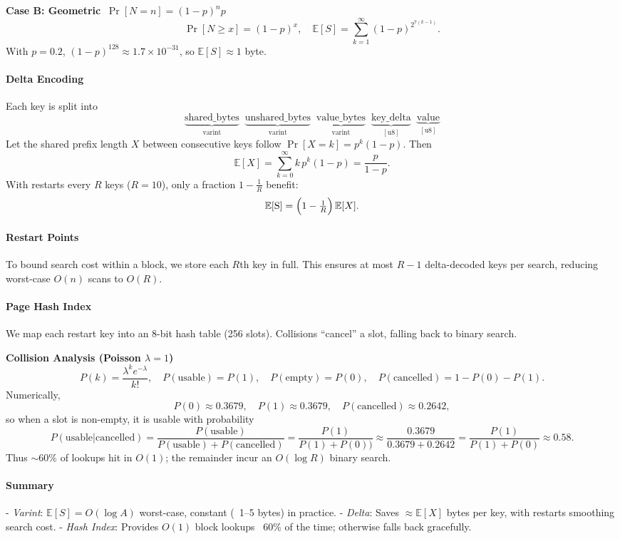 \documentclass[10pt]{article}
\begin{document}
\textbf{Case B: Geometric \(\, \Pr[N=n]=(1-p)^n p\)}
\[
\Pr[N\ge x] = (1-p)^x,\quad
\mathbb{E}[S] = \sum_{k=1}^\infty (1-p)^{2^{7(k-1)}}.
\]
With \(p=0.2\), \((1-p)^{128}\approx1.7\times10^{-31}\), so \(\mathbb{E}[S]\approx1\) byte.

\paragraph{Delta Encoding}
Each key is split into
\[
\underbrace{\text{shared\_bytes}}_{\text{varint}}
\;\;
\underbrace{\text{unshared\_bytes}}_{\text{varint}}
\;\;
\underbrace{\text{value\_bytes}}_{\text{varint}}
\;\;
\underbrace{\text{key\_delta}}_{[\text{u8}]}
\;\;
\underbrace{\text{value}}_{[\text{u8}]}
\]
Let the shared prefix length \(X\) between consecutive keys follow
\(\Pr[X=k]=p^k(1-p)\).  Then
\[
\mathbb{E}[X] = \sum_{k=0}^\infty k\,p^k(1-p) = \frac{p}{1-p}.
\]
With restarts every \(R\) keys (\(R=10\)), only a fraction \(1-\tfrac1R\) benefit:
\[
\mathbb{E}[\text{S}] = \Bigl(1 - \tfrac1R\Bigr)\,\mathbb{E}[X].
\]

\paragraph{Restart Points}
To bound search cost within a block, we store each \(R\)th key in full.  This ensures
at most \(R-1\) delta-decoded keys per search, reducing worst-case \(O(n)\) scans to \(O(R)\).

\paragraph{Page Hash Index}
We map each restart key into an 8-bit hash table (256 slots).  Collisions “cancel” a slot, falling back to binary search.

\textbf{Collision Analysis (Poisson \(\lambda=1\))}
\[
P(k) = \frac{\lambda^k e^{-\lambda}}{k!},\quad
P(\text{usable}) = P(1),\quad
P(\text{empty}) = P(0),\quad
P(\text{cancelled}) = 1 - P(0) - P(1).
\]
Numerically,
\[
P(0)\approx0.3679,\quad
P(1)\approx0.3679,\quad
P(\text{cancelled})\approx0.2642,
\]
so when a slot is non-empty, it is usable with probability
\[
P(\text{usable}|\text{cancelled}) = \frac{P(\text{usable})}{P(\text{usable}) + P(\text{cancelled})}
= \frac{P(1)}{P(1) + P(0))} \approx \frac{0.3679}{0.3679 + 0.2642} = \frac{P(1)}{P(1) + P(0)} \approx 0.58.
\]
Thus \(\sim60\%\) of lookups hit in \(O(1)\); the remainder incur an \(O(\log R)\) binary search.

\paragraph{Summary}
- \emph{Varint}: \(\mathbb{E}[S]=O(\log A)\) worst-case, constant (~1–5 bytes) in practice.
- \emph{Delta}: Saves \(\approx\mathbb{E}[X]\) bytes per key, with restarts smoothing search cost.
- \emph{Hash Index}: Provides \(O(1)\) block lookups ~60\% of the time; otherwise falls back gracefully.
\end{document}
